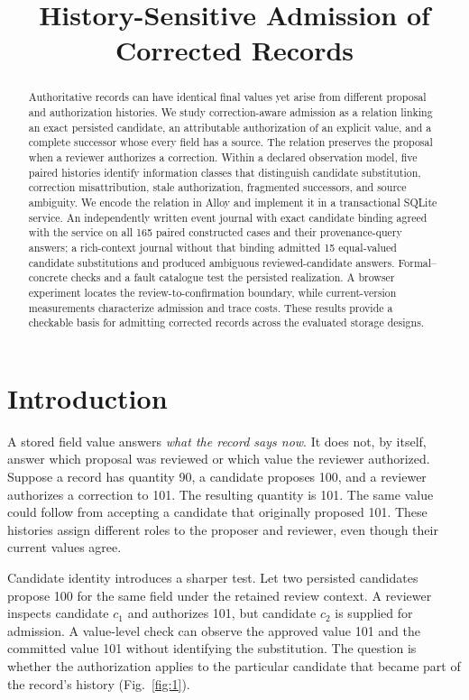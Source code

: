 \documentclass[preprint,12pt,authoryear]{elsarticle}
\begin{document}
\begin{frontmatter}
\title{History-Sensitive Admission of Corrected Records}
\begin{abstract}
Authoritative records can have identical final values yet arise from different proposal and authorization histories. We study correction-aware admission as a relation linking an exact persisted candidate, an attributable authorization of an explicit value, and a complete successor whose every field has a source. The relation preserves the proposal when a reviewer authorizes a correction. Within a declared observation model, five paired histories identify information classes that distinguish candidate substitution, correction misattribution, stale authorization, fragmented successors, and source ambiguity. We encode the relation in Alloy and implement it in a transactional SQLite service. An independently written event journal with exact candidate binding agreed with the service on all 165 paired constructed cases and their provenance-query answers; a rich-context journal without that binding admitted 15 equal-valued candidate substitutions and produced ambiguous reviewed-candidate answers. Formal–concrete checks and a fault catalogue test the persisted realization. A browser experiment locates the review-to-confirmation boundary, while current-version measurements characterize admission and trace costs. These results provide a checkable basis for admitting corrected records across the evaluated storage designs.

\end{abstract}
\end{frontmatter}

\section{Introduction}

A stored field value answers \emph{what the record says now}. It does not, by itself, answer which proposal was reviewed or which value the reviewer authorized. Suppose a record has quantity 90, a candidate proposes 100, and a reviewer authorizes a correction to 101. The resulting quantity is 101. The same value could follow from accepting a candidate that originally proposed 101. These histories assign different roles to the proposer and reviewer, even though their current values agree.

Candidate identity introduces a sharper test. Let two persisted candidates propose 100 for the same field under the retained review context. A reviewer inspects candidate $c_1$ and authorizes 101, but candidate $c_2$ is supplied for admission. A value-level check can observe the approved value 101 and the committed value 101 without identifying the substitution. The question is whether the authorization applies to the particular candidate that became part of the record's history (Fig.~\ref{fig:1}).
\end{document}
